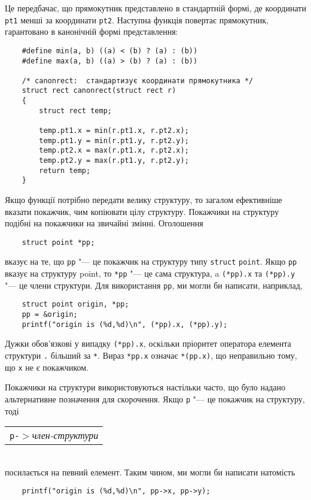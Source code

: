 \documentclass[a4paper,12pt]{book}
\begin{document}
  Це передбачає, що прямокутник представлено в стандартній формі, де координати
  \texttt{pt1} менші за координати \texttt{pt2}. Наступна функція повертає прямокутник,
  гарантовано в канонічній формі представлення:
  \begin{verbatim}
    #define min(a, b) ((a) < (b) ? (a) : (b))
    #define max(a, b) ((a) > (b) ? (a) : (b))

    /* canonrect:  стандартизує координати прямокутника */
    struct rect canonrect(struct rect r)
    {
        struct rect temp;

        temp.pt1.x = min(r.pt1.x, r.pt2.x);
        temp.pt1.y = min(r.pt1.y, r.pt2.y);
        temp.pt2.x = max(r.pt1.x, r.pt2.x);
        temp.pt2.y = max(r.pt1.y, r.pt2.y);
        return temp;
    }
  \end{verbatim}

  Якщо функції потрібно передати велику структуру, то загалом ефективніше вказати
  покажчик, чим копіювати цілу структуру. Покажчики на структуру подібні на покажчики на
  звичайні змінні. Оголошення
  \begin{verbatim}
    struct point *pp;
  \end{verbatim}
  вказує на те, що \texttt{pp} "--- це покажчик на структуру типу \texttt{struct}
  \texttt{point}. Якщо \texttt{pp} вказує на структуру point, то \texttt{*pp} "--- це
  сама структура, a \texttt{(*pp).x} та \texttt{(*pp).y} "--- це члени структури. Для
  використання \texttt{pp}, ми могли би написати, наприклад,
  \begin{verbatim}
    struct point origin, *pp;
    pp = &origin;
    printf("origin is (%d,%d)\n", (*pp).x, (*pp).y);
  \end{verbatim}

  Дужки обов'язкові у випадку \texttt{(*pp).x}, оскільки пріоритет оператора елемента
  структури \texttt{.} більший за \texttt{*}. Вираз \texttt{*pp.x} означає
  \texttt{*(pp.x)}, що неправильно тому, що \texttt{x} не є покажчиком.

  Покажчики на структури використовуються настільки часто, що було надано альтернативне
  позначення для скорочення. Якщо \texttt{p} "--- це покажчик на структуру, тоді
  
  \vspace{12pt}
  \begin{tabular}{l}
  \texttt{p-\mbox{$>$}}\textit{член-структури} \\
  \end{tabular}
  \vspace{12pt}
  \\
  посилається на певний елемент. Таким чином, ми могли би написати натомість
  \begin{verbatim}
    printf("origin is (%d,%d)\n", pp->x, pp->y);
  \end{verbatim}
\end{document}
